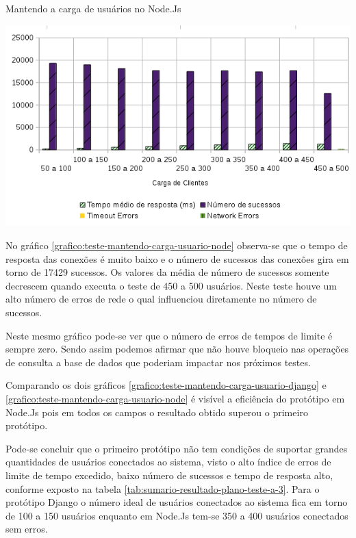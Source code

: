   \begin{grafico}[H]
    \setlength{\abovecaptionskip}{5pt}
    \setlength{\belowcaptionskip}{0pt}
    \label{grafico:teste-mantendo-carga-usuario-node}
    \caption[Mantendo a carga de usuários no Node.Js]
	    {Mantendo a carga de usuários no Node.Js}
    \centering
    \includegraphics[width=.80\textwidth]{imagem/graficos/grafico_node_plano_de_teste_3.png}
    \captionsetup[grafico]{justification=centering}
  \end{grafico}

  No gráfico \ref{grafico:teste-mantendo-carga-usuario-node}  observa-se que o tempo de resposta das conexões 
  é muito baixo e o número de sucessos das conexões gira em torno de 17429 sucessos. Os valores da média de
  número de sucessos somente decrescem quando executa o teste de 450 a 500 usuários. Neste teste houve um alto número de erros 
  de rede o qual influenciou diretamente no número de sucessos.
  
  Neste mesmo gráfico pode-se ver que o número de erros de tempos de limite é sempre zero. Sendo assim podemos afirmar
  que não houve bloqueio nas operações de consulta a base de dados que poderiam impactar nos próximos testes.
  
  Comparando os dois gráficos \ref{grafico:teste-mantendo-carga-usuario-django} e \ref{grafico:teste-mantendo-carga-usuario-node} é
  visível a eficiência do protótipo em Node.Js pois em todos os campos o resultado obtido superou o primeiro protótipo.
  
  Pode-se concluir que o primeiro protótipo não tem condições de suportar grandes quantidades de usuários conectados ao
  sistema, visto o alto índice de erros de limite de tempo excedido, baixo número de sucessos e tempo de resposta alto, 
  conforme exposto na tabela \ref{tab:sumario-resultado-plano-teste-a-3}. Para o protótipo Django o número ideal de usuários
  conectados ao sistema fica em torno de 100 a 150 usuários enquanto em Node.Js tem-se 350 a 400 usuários conectados sem 
  erros.
  
  